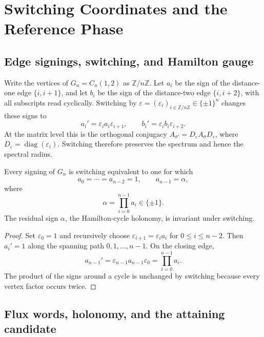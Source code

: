 \section{Switching Coordinates and the Reference Phase}
\label{sec:switching-reference}

\subsection{Edge signings, switching, and Hamilton gauge}
\label{subsec:edge-signings-switching-hamilton-gauge}

Write the vertices of \(G_n=C_n(1,2)\) as \(\mathbb Z/n\mathbb Z\).  Let
\(a_i\) be the sign of the distance-one edge \(\{i,i+1\}\), and let \(b_i\)
be the sign of the distance-two edge \(\{i,i+2\}\), with all subscripts
read cyclically.  Switching by
\(\varepsilon=(\varepsilon_i)_{i\in\mathbb Z/n\mathbb Z}\in\{\pm1\}^n\)
changes these signs to
\[
a_i'=\varepsilon_i a_i\varepsilon_{i+1},
\qquad
b_i'=\varepsilon_i b_i\varepsilon_{i+2}.
\]
At the matrix level this is the orthogonal conjugacy
\(A_{\sigma'}=D_\varepsilon A_\sigma D_\varepsilon\), where
\(D_\varepsilon=\operatorname{diag}(\varepsilon_i)\). Switching therefore
preserves the spectrum and hence the spectral radius.

\begin{lemma}\label{lem:hamilton-gauge}
Every signing of \(G_n\) is switching equivalent to one for which
\[
a_0=\cdots=a_{n-2}=1,\qquad a_{n-1}=\alpha,
\]
where
\[
\alpha=\prod_{i=0}^{n-1}a_i\in\{\pm1\}.
\]
The residual sign \(\alpha\), the Hamilton-cycle holonomy, is invariant
under switching.
\end{lemma}

\begin{proof}
Set \(\varepsilon_0=1\) and recursively choose
\(\varepsilon_{i+1}=\varepsilon_i a_i\) for \(0\leq i\leq n-2\).
Then \(a_i'=1\) along the spanning path \(0,1,\ldots,n-1\).  On the closing
edge,
\[
a_{n-1}'=\varepsilon_{n-1}a_{n-1}\varepsilon_0
=\prod_{i=0}^{n-1}a_i.
\]
The product of the signs around a cycle is unchanged by switching because
every vertex factor occurs twice.
\end{proof}

\subsection{Flux words, holonomy, and the attaining candidate}
\label{subsec:flux-words-holonomy-attaining-candidate}

